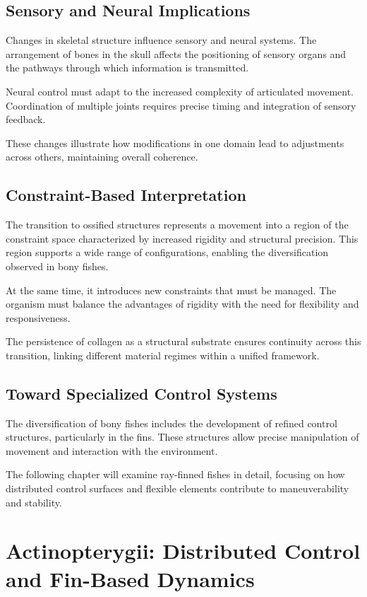 \documentclass[11pt,oneside]{book}
\begin{document}
\section{Sensory and Neural Implications}

Changes in skeletal structure influence sensory and neural systems. The arrangement of bones in the skull affects the positioning of sensory organs and the pathways through which information is transmitted.

Neural control must adapt to the increased complexity of articulated movement. Coordination of multiple joints requires precise timing and integration of sensory feedback.

These changes illustrate how modifications in one domain lead to adjustments across others, maintaining overall coherence.

\section{Constraint-Based Interpretation}

The transition to ossified structures represents a movement into a region of the constraint space characterized by increased rigidity and structural precision. This region supports a wide range of configurations, enabling the diversification observed in bony fishes.

At the same time, it introduces new constraints that must be managed. The organism must balance the advantages of rigidity with the need for flexibility and responsiveness.

The persistence of collagen as a structural substrate ensures continuity across this transition, linking different material regimes within a unified framework.

\section{Toward Specialized Control Systems}

The diversification of bony fishes includes the development of refined control structures, particularly in the fins. These structures allow precise manipulation of movement and interaction with the environment.

The following chapter will examine ray-finned fishes in detail, focusing on how distributed control surfaces and flexible elements contribute to maneuverability and stability.

\chapter{Actinopterygii: Distributed Control and Fin-Based Dynamics}
\end{document}
